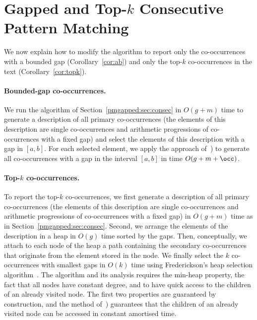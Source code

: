 \section{Gapped and Top-\texorpdfstring{$k$}{k} Consecutive Pattern Matching}
We now explain how to modify the algorithm to report only the co-occurrences with a bounded gap (Corollary~\ref{cor:ab}) and only the top-$k$ co-occurrences in the text (Corollary~\ref{cor:topk}).

\paragraph*{Bounded-gap co-occurrences.} We run the algorithm of Section~\ref{pmgapped:sec:consec} in $O(g+m)$ time to generate a description of all primary co-occurrences (the elements of this description are single co-occurrences and arithmetic progressions of co-occurrences with a fixed gap) and select the elements of this description with a gap in $[a,b]$. For each selected element, we apply the approach of~\cite[Section 6.4]{talg/ChristiansenEKN21}) to generate all co-occurrences with a gap in the interval $[a,b]$ in time $O(g+m+\occ)$. 

\paragraph*{Top-$k$ co-occurrences.}
To report the top-$k$ co-occurrences, we first generate a description of all primary co-occurrences (the elements of this description are single co-occurrences and arithmetic progressions of co-occurrences with a fixed gap) in $O(g+m)$ time as in Section~\ref{pmgapped:sec:consec}. Second,  we arrange the elements of the description in a heap in $O(g)$ time sorted by the gaps. Then, conceptually, we attach to each node of the heap a path containing the secondary co-occurrences that originate from the element stored in the node. We finally select the $k$ co-occurrences with smallest gaps in $O(k)$ time using Frederickson's heap selection algorithm~\cite{FREDERICKSON1993197}. The algorithm and its analysis requires the min-heap property, the fact that all nodes have constant degree, and to have quick access to the children of an already visited node. The first two properties are guaranteed by construction, and the method of~\cite[Section 6.4]{talg/ChristiansenEKN21}) guarantees that the children of an already visited node can be accessed in constant amortised time.
